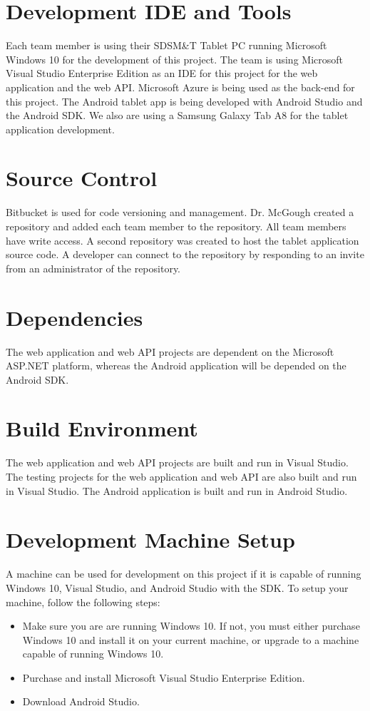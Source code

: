 \section{Development IDE and Tools}
Each team member is using their SDSM\&T Tablet PC running Microsoft Windows 10 for the development of this project. The team is using Microsoft Visual Studio Enterprise Edition as an IDE for this project for the web application and the web API. Microsoft Azure is being used as the back-end for this project. The Android tablet app is being developed with Android Studio and the Android SDK. We also are using a Samsung Galaxy Tab A8 for the tablet application development.

\section{Source  Control}
Bitbucket is used for code versioning and management. Dr. McGough created a repository and added each team member to the repository. All team members have write access. A second repository was created to host the tablet application source code. A developer can connect to the repository by responding to an invite from an administrator of the repository.

\section{Dependencies}
The web application and web API projects are dependent on the Microsoft ASP.NET platform, whereas the Android application will be depended on the Android SDK.

\section{Build  Environment}
The web application and web API projects are built and run in Visual Studio. The testing projects for the web application and web API are also built and run in Visual Studio. The Android application is built and run in Android Studio.

\section{Development Machine Setup}
A machine can be used for development on this project if it is capable of running Windows 10, Visual Studio, and Android Studio with the SDK. To setup your machine, follow the following steps:

\begin{itemize}
\item Make sure you are are running Windows 10. If not, you must either purchase Windows 10 and install it on your current machine, or upgrade to a machine capable of running Windows 10. 
\item Purchase and install Microsoft Visual Studio Enterprise Edition.
\item Download Android Studio.
\end{itemize}


